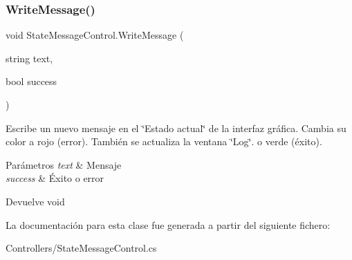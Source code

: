 \subsubsection{\texorpdfstring{WriteMessage()}{WriteMessage()}}
{\footnotesize\ttfamily void State\+Message\+Control.\+Write\+Message (\begin{DoxyParamCaption}\item[{string}]{text,  }\item[{bool}]{success }\end{DoxyParamCaption})\hspace{0.3cm}{\ttfamily [inline]}}

Escribe un nuevo mensaje en el \char`\"{}\+Estado actual\char`\"{} de la interfaz gráfica. Cambia su color a rojo (error). También se actualiza la ventana \char`\"{}\+Log\char`\"{}. o verde (éxito). 
\begin{DoxyParams}{Parámetros}
{\em text} & Mensaje \\
\hline
{\em success} & Éxito o error \\
\hline
\end{DoxyParams}
\begin{DoxyReturn}{Devuelve}
void 
\end{DoxyReturn}


La documentación para esta clase fue generada a partir del siguiente fichero\+:\begin{DoxyCompactItemize}
\item 
Controllers/State\+Message\+Control.\+cs\end{DoxyCompactItemize}
